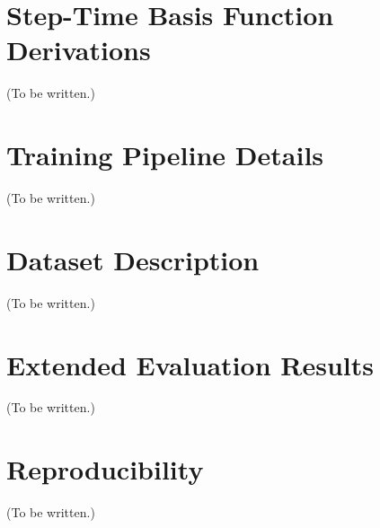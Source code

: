 \documentclass[11pt]{article}
\theoremstyle{plain} %
\theoremstyle{definition} %
\theoremstyle{remark} %
\numberwithin{equation}{section}
\begin{document}
\begin{appendices}

\section{Step-Time Basis Function Derivations}
\label{app:basis}

(To be written.)

\section{Training Pipeline Details}
\label{app:training}

(To be written.)

\section{Dataset Description}
\label{app:dataset}

(To be written.)

\section{Extended Evaluation Results}
\label{app:extended-eval}

(To be written.)

\section{Reproducibility}
\label{app:reproducibility}

(To be written.)

\end{appendices}




\end{document}
